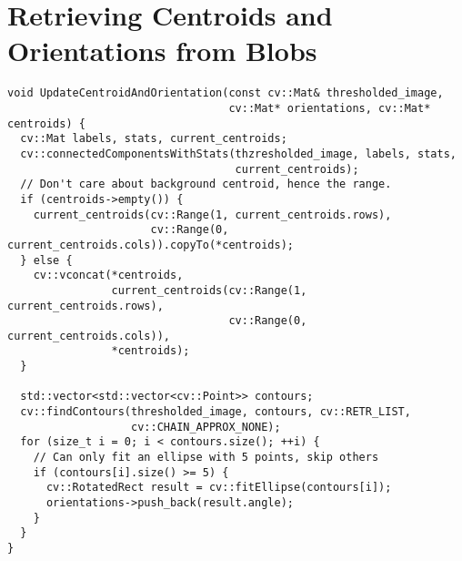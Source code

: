 \chapter{\label{ap:centroids}Retrieving Centroids and Orientations from Blobs}
\begin{verbatim}
void UpdateCentroidAndOrientation(const cv::Mat& thresholded_image,
                                  cv::Mat* orientations, cv::Mat* centroids) {
  cv::Mat labels, stats, current_centroids;
  cv::connectedComponentsWithStats(thzresholded_image, labels, stats,
                                   current_centroids);
  // Don't care about background centroid, hence the range.
  if (centroids->empty()) {
    current_centroids(cv::Range(1, current_centroids.rows),
                      cv::Range(0, current_centroids.cols)).copyTo(*centroids);
  } else {
    cv::vconcat(*centroids,
                current_centroids(cv::Range(1, current_centroids.rows),
                                  cv::Range(0, current_centroids.cols)),
                *centroids);
  }

  std::vector<std::vector<cv::Point>> contours;
  cv::findContours(thresholded_image, contours, cv::RETR_LIST,
                   cv::CHAIN_APPROX_NONE);
  for (size_t i = 0; i < contours.size(); ++i) {
    // Can only fit an ellipse with 5 points, skip others
    if (contours[i].size() >= 5) {
      cv::RotatedRect result = cv::fitEllipse(contours[i]);
      orientations->push_back(result.angle);
    }
  }
}
\end{verbatim}
